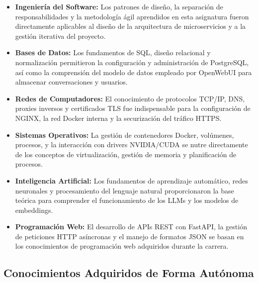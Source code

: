 \begin{itemize}
    \item \textbf{Ingeniería del Software:} Los patrones de diseño, la separación de responsabilidades y la metodología ágil aprendidos en esta asignatura fueron directamente aplicables al diseño de la arquitectura de microservicios y a la gestión iterativa del proyecto.

    \item \textbf{Bases de Datos:} Los fundamentos de SQL, diseño relacional y normalización permitieron la configuración y administración de PostgreSQL, así como la comprensión del modelo de datos empleado por OpenWebUI para almacenar conversaciones y usuarios.

    \item \textbf{Redes de Computadores:} El conocimiento de protocolos TCP/IP, DNS, proxies inversos y certificados TLS fue indispensable para la configuración de NGINX, la red Docker interna y la securización del tráfico HTTPS.

    \item \textbf{Sistemas Operativos:} La gestión de contenedores Docker, volúmenes, procesos, y la interacción con drivers NVIDIA/CUDA se nutre directamente de los conceptos de virtualización, gestión de memoria y planificación de procesos.

    \item \textbf{Inteligencia Artificial:} Los fundamentos de aprendizaje automático, redes neuronales y procesamiento del lenguaje natural proporcionaron la base teórica para comprender el funcionamiento de los LLMs y los modelos de embeddings.

    \item \textbf{Programación Web:} El desarrollo de APIs REST con FastAPI, la gestión de peticiones HTTP asíncronas y el manejo de formatos JSON se basan en los conocimientos de programación web adquiridos durante la carrera.
\end{itemize}

\subsection{Conocimientos Adquiridos de Forma Autónoma}

